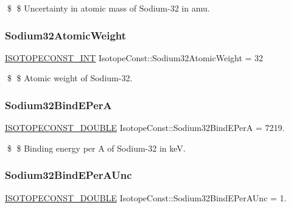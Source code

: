 \$ \$ Uncertainty in atomic mass of Sodium-\/32 in amu. \mbox{\label{group___isotope_const-_sodium-_na32_ga108e7f667d2bd22754198bd5e47ee49d}} 
\subsubsection{\texorpdfstring{Sodium32\+Atomic\+Weight}{Sodium32AtomicWeight}}
{\footnotesize\ttfamily \mbox{\hyperlink{group___isotope_const-_macros_ga5f18360b3e99483a35c32d789e62621c}{I\+S\+O\+T\+O\+P\+E\+C\+O\+N\+S\+T\+\_\+\+I\+NT}} Isotope\+Const\+::\+Sodium32\+Atomic\+Weight = 32}

\$ \$ Atomic weight of Sodium-\/32. \mbox{\label{group___isotope_const-_sodium-_na32_ga1f66eeb504b61462397427cc43f01b98}} 
\subsubsection{\texorpdfstring{Sodium32\+Bind\+E\+PerA}{Sodium32BindEPerA}}
{\footnotesize\ttfamily \mbox{\hyperlink{group___isotope_const-_macros_ga8f45a7272ce02c0b4c65c44636ed719a}{I\+S\+O\+T\+O\+P\+E\+C\+O\+N\+S\+T\+\_\+\+D\+O\+U\+B\+LE}} Isotope\+Const\+::\+Sodium32\+Bind\+E\+PerA = 7219.}

\$ \$ Binding energy per A of Sodium-\/32 in keV. \mbox{\label{group___isotope_const-_sodium-_na32_gaf6de90aaabd13daf29a502f64bef31f0}} 
\subsubsection{\texorpdfstring{Sodium32\+Bind\+E\+Per\+A\+Unc}{Sodium32BindEPerAUnc}}
{\footnotesize\ttfamily \mbox{\hyperlink{group___isotope_const-_macros_ga8f45a7272ce02c0b4c65c44636ed719a}{I\+S\+O\+T\+O\+P\+E\+C\+O\+N\+S\+T\+\_\+\+D\+O\+U\+B\+LE}} Isotope\+Const\+::\+Sodium32\+Bind\+E\+Per\+A\+Unc = 1.}

